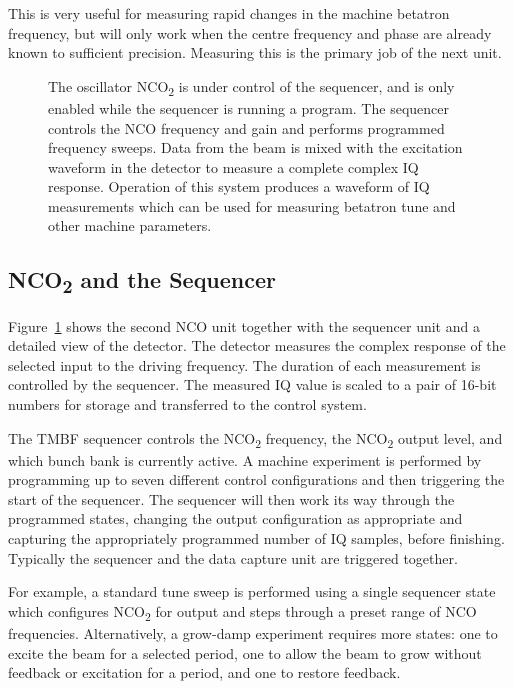 \documentclass{jacow}
\newcommand{\squarecaption}[2][1]{\caption[#1]{#2\unskip\parfillskip 0pt}}
\begin{document}
This is very useful for measuring rapid changes in the machine betatron
frequency, but will only work when the centre frequency and phase are already
known to sufficient precision.  Measuring this is the primary job of the next
unit.



\begin{figure}[hbt]
\begin{centering}

\end{centering}
\squarecaption{
The oscillator NCO\textsubscript2 is under control of the sequencer, and is only
enabled while the sequencer is running a program.  The sequencer controls the
NCO frequency and gain and performs programmed frequency sweeps.  Data from the
beam is mixed with the excitation waveform  in the detector to measure a
complete complex IQ response.  Operation of this system produces a waveform of
IQ measurements which can be used for measuring betatron tune and other machine
parameters.
}
\label{nco2}
\end{figure}

\subsection{NCO\textsubscript2 and the Sequencer}

Figure~\ref{nco2} shows the second NCO unit together with the sequencer unit and
a detailed view of the detector.  The detector measures the complex response of
the selected input to the driving frequency.  The duration of each measurement
is controlled by the sequencer.  The measured IQ value is scaled to a pair of
16-bit numbers for storage and transferred to the control system.

The TMBF sequencer controls the NCO\textsubscript2 frequency, the
NCO\textsubscript2 output level, and which bunch bank is currently active.  A
machine experiment is performed by programming up to seven different control
configurations and then triggering the start of the sequencer.  The sequencer
will then work its way through the programmed states, changing the output
configuration as appropriate and capturing the appropriately programmed number
of IQ samples, before finishing.  Typically the sequencer and the data capture
unit are triggered together.

For example, a standard tune sweep is performed using a single sequencer state
which configures NCO\textsubscript2 for output and steps through a preset range
of NCO frequencies.  Alternatively, a grow-damp experiment requires more states:
one to excite the beam for a selected period, one to allow the beam to grow
without feedback or excitation for a period, and one to restore feedback.
\end{document}
